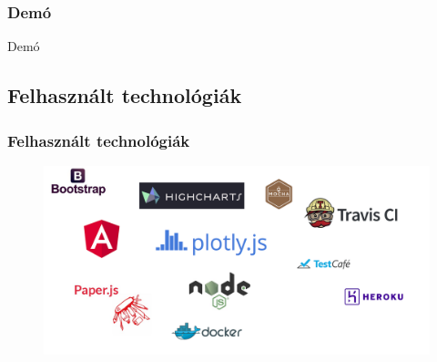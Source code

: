 \begin{frame}
	\frametitle{Demó}
	\Huge{\centerline{Demó}}
\end{frame}

\subsection{Felhasznált technológiák}
\begin{frame}
	\frametitle{Felhasznált technológiák}
	\begin{figure}[ht!]
		\centering
		\includegraphics[width=\linewidth]{images/technologies}
	\end{figure}
\end{frame}
